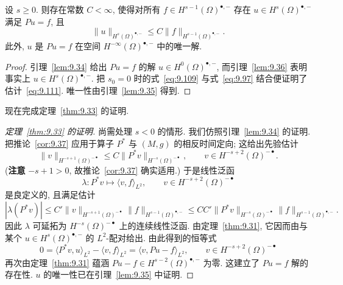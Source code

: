 \begin{corollary}[存在性与唯一性: $s \ge 0$]\label{cor:9.37}
设 $s \ge 0$. 则存在常数 $C < \infty$, 使得对所有 $f \in H^{s-1}(\Omega)^{\bullet,-}$ 存在 $u \in H^s(\Omega)^{\bullet,-}$ 满足 $P u = f$, 且
\begin{equation}\label{eq:9.111}
    \|u\|_{H^s(\Omega)^{\bullet,-}} \le C \|f\|_{H^{s-1}(\Omega)^{\bullet,-}}.
\end{equation}
此外, $u$ 是 $P u = f$ 在空间 $H^{-\infty}(\Omega)^{\bullet,-}$ 中的唯一解.
\end{corollary}

\begin{proof}
引理~\ref{lem:9.34} 给出 $P u = f$ 的解 $u \in H^0(\Omega)^{\bullet,-}$, 而引理~\ref{lem:9.36} 表明事实上 $u \in H^s(\Omega)^{\bullet,-}$. 把 $s_0 = 0$ 时的式~\eqref{eq:9.109} 与式~\eqref{eq:9.97} 结合便证明了估计~\eqref{eq:9.111}. 唯一性由引理~\ref{lem:9.35} 得到.
\end{proof}

现在完成定理~\ref{thm:9.33} 的证明.

\begin{proof}[定理~\ref{thm:9.33} 的证明]
尚需处理 $s < 0$ 的情形. 我们仿照引理~\ref{lem:9.34} 的证明. 把推论~\ref{cor:9.37} 应用于算子 $P^*$ 与 $(M, g)$ 的相反时间定向; 这给出先验估计
\begin{equation}\label{eq:9.112}
    \|v\|_{H^{-s+1}(\Omega)^{-\bullet}} \le C \|P^* v\|_{H^{-s}(\Omega)^{-\bullet}}, \qquad v \in H^{-s+2}(\Omega)^{-\bullet}.
\end{equation}
(\textbf{注意} $-s+1 > 0$, 故推论~\ref{cor:9.37} 确实适用.) 于是线性泛函
\begin{equation}\label{eq:9.113}
    \lambda \colon P^* v \mapsto \langle v, f \rangle_{L^2}, \qquad v \in H^{-s+2}(\Omega)^{-\bullet}
\end{equation}
是良定义的, 且满足估计
\begin{equation}\label{eq:9.114}
    |\lambda(P^* v)| \le C' \|v\|_{H^{-s+1}(\Omega)^{-\bullet}} \|f\|_{H^{s-1}(\Omega)^{\bullet,-}} \le CC' \|P^* v\|_{H^{-s}(\Omega)^{-\bullet}} \|f\|_{H^{s-1}(\Omega)^{\bullet,-}}.
\end{equation}
因此 $\lambda$ 可延拓为 $H^{-s}(\Omega)^{-\bullet}$ 上的连续线性泛函. 由定理~\ref{thm:9.31}, 它因而由与某个 $u \in H^s(\Omega)^{\bullet,-}$ 的 $L^2$-配对给出. 由此得到的恒等式
\begin{equation}\label{eq:9.115}
    0 = \langle P^* v, u \rangle_{L^2} - \langle v, f \rangle_{L^2} = \langle v, P u - f \rangle_{L^2}, \qquad v \in H^{-s+2}(\Omega)^{-\bullet}
\end{equation}
再次由定理~\ref{thm:9.31} 蕴涵 $P u - f \in H^{s-2}(\Omega)^{\bullet,-}$ 为零. 这建立了 $P u = f$ 解的存在性. $u$ 的唯一性已在引理~\ref{lem:9.35} 中证明.
\end{proof}

